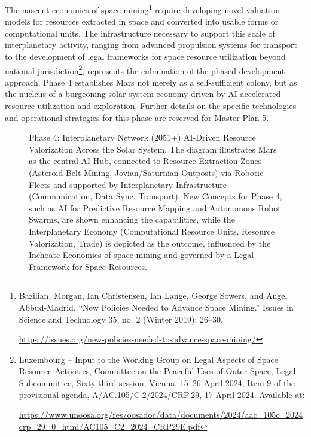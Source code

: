 \documentclass[fontsize=10pt, oneside, DIV=calc]{scrartcl}
\begin{document}
\medskip

\noindent
The nascent economics of space mining\footnote{Bazilian, Morgan, Ian Christensen, Ian Lange, George Sowers, and Angel Abbud-Madrid. ``New Policies Needed to Advance Space Mining.'' Issues in Science and Technology 35, no. 2 (Winter 2019): 26--30. 







\href{https://issues.org/new-policies-needed-to-advance-space-mining/}\url{https://issues.org/new-policies-needed-to-advance-space-mining/}} require developing novel valuation models for resources extracted in space and converted into usable forms or computational units. The infrastructure necessary to support this scale of interplanetary activity, ranging from advanced propulsion systems for transport to the development of legal frameworks for space resource utilization beyond national jurisdiction\footnote{Luxembourg – Input to the Working Group on Legal Aspects of Space Resource Activities, Committee on the Peaceful Uses of Outer Space, Legal Subcommittee, Sixty-third session, Vienna, 15–26 April 2024, Item 9 of the provisional agenda, A/AC.105/C.2/2024/CRP.29, 17 April 2024. Available at: 







\href{https://www.unoosa.org/res/oosadoc/data/documents/2024/aac\_105c\_22024crp/aac\_105c\_2024crp\_29\_0\_html/AC105\_C2\_2024\_CRP29E.pdf}\url{https://www.unoosa.org/res/oosadoc/data/documents/2024/aac\_105c\_2024crp\_29\_0\_html/AC105\_C2\_2024\_CRP29E.pdf}}, represents the culmination of the phased development approach. Phase 4 establishes Mars not merely as a self-sufficient colony, but as the nucleus of a burgeoning solar system economy driven by AI-accelerated resource utilization and exploration. Further details on the specific technologies and operational strategies for this phase are reserved for Master Plan 5.

\medskip

\noindent


\begin{figure}[H]
  \centering
  \noindent
  \begin{minipage}{\textwidth}
    \centering
    \caption{Phase 4: Interplanetary Network (2051+) AI-Driven Resource Valorization Across the Solar System. The diagram illustrates Mars as the central AI Hub, connected to Resource Extraction Zones (Asteroid Belt Mining, Jovian/Saturnian Outposts) via Robotic Fleets and supported by Interplanetary Infrastructure (Communication, Data Sync, Transport). New Concepts for Phase 4, such as AI for Predictive Resource Mapping and Autonomous Robot Swarms, are shown enhancing the capabilities, while the Interplanetary Economy (Computational Resource Units, Resource Valorization, Trade) is depicted as the outcome, influenced by the Inchoate Economics of space mining and governed by a Legal Framework for Space Resources.}
  \end{minipage}
\end{figure}
\end{document}
